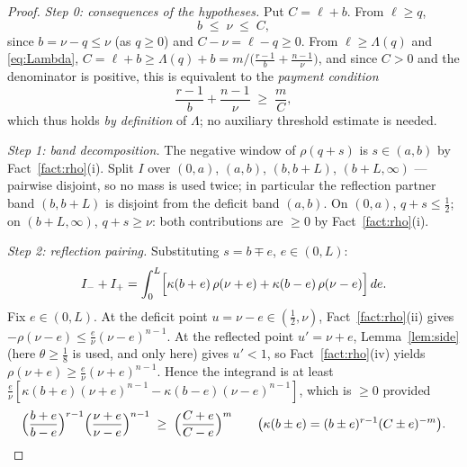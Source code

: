 \documentclass[11pt]{amsart}
\theoremstyle{remark}
\begin{document}
\begin{proof}
\emph{Step 0: consequences of the hypotheses.}  Put $C=\ell+b$.  From $\ell\ge q$,
\begin{equation}\label{eq:chain}
        b\;\le\;\nu\;\le\;C,
\end{equation}
since $b=\nu-q\le\nu$ (as $q\ge0$) and $C-\nu=\ell-q\ge0$.  From $\ell\ge\Lambda(q)$ and \eqref{eq:Lambda},
$C=\ell+b\ge\Lambda(q)+b=m\big/\bigl(\tfrac{r-1}{b}+\tfrac{n-1}{\nu}\bigr)$,
and since $C>0$ and the denominator is positive, this is equivalent to the \emph{payment condition}
\begin{equation}\label{eq:payment}
        \frac{r-1}{b}+\frac{n-1}{\nu}\;\ge\;\frac mC ,
\end{equation}
which thus holds \emph{by definition} of $\Lambda$; no auxiliary threshold estimate is needed.

\emph{Step 1: band decomposition.}  The negative window of $\rho(q+s)$ is $s\in(a,b)$ by Fact~\ref{fact:rho}(i).  Split $I$ over $(0,a)$, $(a,b)$, $(b,b+L)$, $(b+L,\infty)$ --- pairwise disjoint, so no mass is used twice; in particular the reflection partner band $(b,b+L)$ is disjoint from the deficit band $(a,b)$.  On $(0,a)$, $q+s\le\tfrac12$; on $(b+L,\infty)$, $q+s\ge\nu$: both contributions are $\ge0$ by Fact~\ref{fact:rho}(i).

\emph{Step 2: reflection pairing.}  Substituting $s=b\mp e$, $e\in(0,L)$:
\[
        I_-+I_+=\int_0^{L}
        \Bigl[\kappa(b+e)\,\rho(\nu+e)+\kappa(b-e)\,\rho(\nu-e)\Bigr]\,de .
\]
Fix $e\in(0,L)$.  At the deficit point $u=\nu-e\in(\tfrac12,\nu)$, Fact~\ref{fact:rho}(ii) gives $-\rho(\nu-e)\le\frac e\nu(\nu-e)^{n-1}$.  At the reflected point $u'=\nu+e$, Lemma~\ref{lem:side} (here $\theta\ge\tfrac18$ is used, and only here) gives $u'<1$, so Fact~\ref{fact:rho}(iv) yields $\rho(\nu+e)\ge\frac e\nu(\nu+e)^{n-1}$.  Hence the integrand is at least
$\frac e\nu[\kappa(b+e)(\nu+e)^{n-1}-\kappa(b-e)(\nu-e)^{n-1}]$,
which is $\ge0$ provided
\begin{equation}\label{eq:product}
        \Bigl(\frac{b+e}{b-e}\Bigr)^{r-1}
        \Bigl(\frac{\nu+e}{\nu-e}\Bigr)^{n-1}
        \;\ge\;
        \Bigl(\frac{C+e}{C-e}\Bigr)^{m}
        \qquad\bigl(\kappa(b\pm e)=(b\pm e)^{r-1}(C\pm e)^{-m}\bigr).
\end{equation}


\end{proof}
\end{document}
